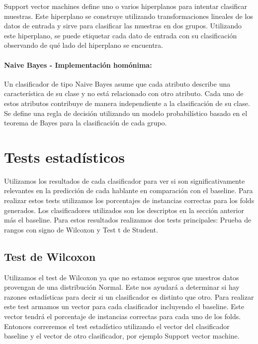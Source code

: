 
Support vector machines define uno o varios hiperplanos para intentar clasificar muestras. Este hiperplano se construye utilizando transformaciones lineales de los datos de entrada y sirve para clasificar las muestras en dos grupos. Utilizando este hiperplano, se puede etiquetar cada dato de entrada con su clasificación observando de qué lado del hiperplano se encuentra.

\paragraph{Naive Bayes \cite{DBLP:conf/flairs/Zhang04} - Implementación homónima:}


Un clasificador de tipo Naive Bayes asume que cada atributo describe una característica de su clase y no está relacionado con otro atributo. Cada uno de estos atributos contribuye de manera independiente a la clasificación de su clase. Se define una regla de decisión utilizando un modelo probabilístico basado en el teorema de Bayes para la clasificación de cada grupo.

\section{Tests estadísticos}

Utilizamos los resultados de cada clasificador para ver si son significativamente relevantes en la predicción de cada hablante en comparación con el baseline. Para realizar estos tests utilizamos los porcentajes de instancias correctas para los folds generados. Los clasificadores utilizados son los descriptos en la sección anterior más el baseline. Para estos resultados realizamos dos tests principales: Prueba de rangos con signo de Wilcoxon y Test t de Student. 

\subsection{Test de Wilcoxon}

Utilizamos el test de Wilcoxon ya que no estamos seguros que nuestros datos provengan de una distribución Normal. Este nos ayudará a determinar si hay razones estadísticas para decir si un clasificador es distinto que otro. Para realizar este test armamos un vector para cada clasificador incluyendo el baseline. Este vector tendrá el porcentaje de instancias correctas para cada uno de los folds. Entonces correremos el test estadístico utilizando el vector del clasificador baseline y el vector de otro clasificador, por ejemplo Support vector machine.

